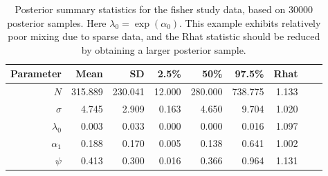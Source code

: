\begin{table}
\caption{
Posterior summary statistics for the fisher study data, based on 30000
posterior samples. Here $\lambda_{0} = \exp(\alpha_{0})$. This example
exhibits relatively poor mixing due to sparse data, and the Rhat
statistic should be reduced by obtaining a larger posterior sample.
}
\begin{tabular}{rrrrrrrrr}\hline \hline
Parameter   &   Mean  &   SD  &   2.5\%  &    50\%  &   97.5\%  &  Rhat    \\ \hline
$N$         & 315.889 & 230.041 &  12.000  & 280.000  & 738.775   &  1.133    \\
$\sigma$    &   4.745 &   2.909 &   0.163  &   4.650  &   9.704   &  1.020    \\
$\lambda_0$ &   0.003 &   0.033 &   0.000  &   0.000  &   0.016   &  1.097    \\
$\alpha_1$  &   0.188 &   0.170 &   0.005  &   0.138  &   0.641   &  1.002    \\
$\psi$      &   0.413 &   0.300 &   0.016  &   0.366  &   0.964   & 1.131    \\  \hline
\end{tabular}
\label{searchencounter.tab.fisher}
\end{table}


